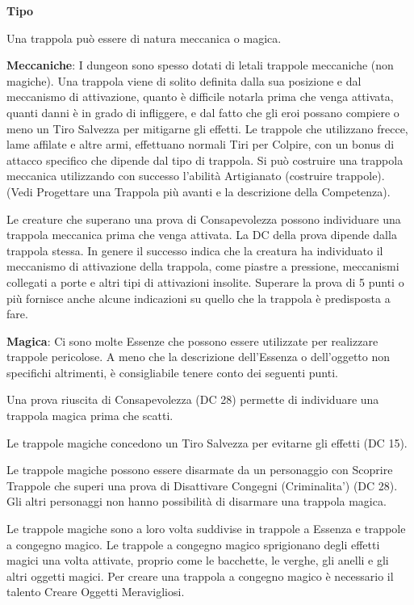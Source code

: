 \documentclass[a4paper,11pt,twoside,openany]{book}
\begin{document}
{\textbf{Tipo}

Una trappola può essere di natura meccanica o magica.

\textbf{Meccaniche}: I dungeon sono spesso dotati di letali trappole meccaniche (non magiche). Una trappola viene di solito definita dalla sua posizione e dal meccanismo di attivazione, quanto è difficile notarla prima che venga attivata, quanti danni è in grado di infliggere, e dal fatto che gli eroi possano compiere o meno un Tiro Salvezza per mitigarne gli effetti. Le trappole che utilizzano frecce, lame affilate e altre armi, effettuano normali Tiri per Colpire, con un bonus di attacco specifico che dipende dal tipo di trappola. Si può costruire una trappola meccanica utilizzando con successo l'abilità Artigianato (costruire trappole). (Vedi Progettare una Trappola più avanti e la descrizione della Competenza).

Le creature che superano una prova di Consapevolezza possono individuare una trappola meccanica prima che venga attivata. La DC della prova dipende dalla trappola stessa. In genere il successo indica che la creatura ha individuato il meccanismo di attivazione della trappola, come piastre a pressione, meccanismi collegati a porte e altri tipi di attivazioni insolite. Superare la prova di 5 punti o più fornisce anche alcune indicazioni su quello che la trappola è predisposta a fare.

\textbf{Magica}: Ci sono molte Essenze che possono essere utilizzate per realizzare trappole pericolose. A meno che la descrizione dell'Essenza o dell'oggetto non specifichi altrimenti, è consigliabile tenere conto dei seguenti punti.

Una prova riuscita di Consapevolezza (DC 28) permette di individuare una trappola magica prima che scatti.

Le trappole magiche concedono un Tiro Salvezza per evitarne gli effetti (DC 15).

Le trappole magiche possono essere disarmate da un personaggio con Scoprire Trappole che superi una prova di Disattivare Congegni (Criminalita') (DC 28). Gli altri personaggi non hanno possibilità di disarmare una trappola magica.

Le trappole magiche sono a loro volta suddivise in trappole a Essenza e trappole a congegno magico. Le trappole a congegno magico sprigionano degli effetti magici una volta attivate, proprio come le bacchette, le verghe, gli anelli e gli altri oggetti magici. Per creare una trappola a congegno magico è necessario il talento Creare Oggetti Meravigliosi. 

}
\end{document}
